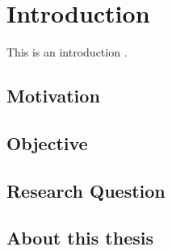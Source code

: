 \chapter{Introduction}
This is an introduction \cite{website:test01}.
\section{Motivation}
\section{Objective}
\section{Research Question}
\section{About this thesis}